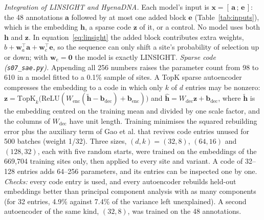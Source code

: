 \documentclass[11pt]{article}
\newcommand{\file}[1]{\nolinkurl{#1}}
\begin{document}
\emph{Integration of LINSIGHT and HyenaDNA.} Each model's input is $\mathbf{x}=[\,\mathbf{a}\,;\,\mathbf{e}\,]$:
the 48 annotations $\mathbf{a}$ followed by at most one added block $\mathbf{e}$ (Table~\ref{tab:inputs}),
which is the embedding $\mathbf{h}$, a sparse code $\mathbf{z}$ of it, or a control. No model uses both
$\mathbf{h}$ and $\mathbf{z}$. In equation~\ref{eq:linsight} the added block contributes extra weights,
$b+\mathbf{w}_a^{\top}\mathbf{a}+\mathbf{w}_e^{\top}\mathbf{e}$, so the sequence can only shift a site's
probability of selection up or down; with $\mathbf{w}_e=\mathbf{0}$ the model is exactly LINSIGHT.
\emph{Sparse code (\file{s07_sae.py}).} Appending all 256 numbers raises the parameter count from 98 to 610
in a model fitted to a 0.1\% sample of sites. A TopK sparse autoencoder compresses the
embedding to a code in which only $k$ of $d$ entries may be nonzero:
$\mathbf{z}=\mathrm{TopK}_k\big(\mathrm{ReLU}(W_{\mathrm{enc}}(\tilde{\mathbf{h}}-\mathbf{b}_{\mathrm{dec}})+\mathbf{b}_{\mathrm{enc}})\big)$
and $\hat{\mathbf{h}}=W_{\mathrm{dec}}\mathbf{z}+\mathbf{b}_{\mathrm{dec}}$, where $\tilde{\mathbf{h}}$ is the
embedding centred on the training mean and divided by one scale factor, and the columns of
$W_{\mathrm{dec}}$ have unit length. Training minimises the squared rebuilding error plus the auxiliary term
of Gao et al. that revives code entries unused for 500 batches (weight 1/32). Three sizes,
$(d,k)=(32,8)$, $(64,16)$ and $(128,32)$, each with five random starts, were trained on the embeddings of
the 669,704 training sites only, then applied to every site and variant. A code of 32--128 entries adds
64--256 parameters, and its entries can be inspected one by one. \emph{Checks:}
every code entry is used, and every autoencoder rebuilds held-out embeddings better than principal
component analysis with as many components (for 32 entries, 4.9\% against 7.4\% of the variance left
unexplained). A second autoencoder of the same kind, $(32,8)$, was trained on the 48 annotations.
\end{document}
